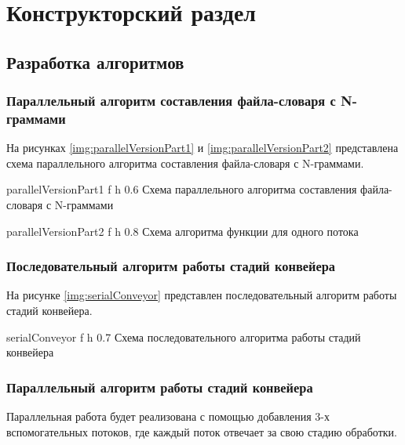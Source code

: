 \chapter{Конструкторский раздел}

\section{Разработка алгоритмов}

\subsection{Параллельный алгоритм составления файла-словаря с N-граммами}

На рисунках \ref{img:parallelVersionPart1} и \ref{img:parallelVersionPart2} представлена схема параллельного алгоритма составления файла-словаря с N-граммами.

{parallelVersionPart1} %
{f} %
{h} %
{0.6\textwidth} %
{Схема параллельного алгоритма составления файла-словаря с N-граммами } %

{parallelVersionPart2} %
{f} %
{h} %
{0.8\textwidth} %
{Схема алгоритма функции для одного потока} %

\clearpage

\subsection{Последовательный алгоритм работы стадий конвейера}

На рисунке \ref{img:serialConveyor} представлен последовательный алгоритм работы стадий
конвейера.

{serialConveyor} %
{f} %
{h} %
{0.7\textwidth} %
{Схема последовательного алгоритма работы стадий конвейера} %

\clearpage

\subsection{Параллельный алгоритм работы стадий конвейера}
Параллельная работа будет реализована с помощью добавления 3-х вспомогательных потоков, где каждый поток отвечает за свою стадию обработки.

